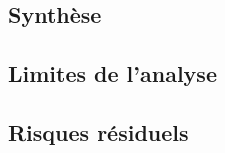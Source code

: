 
\subsection{Synthèse}
\label{sec:synthese}

\subsection{Limites de l'analyse}
\label{sec:limites}

\subsection{Risques résiduels}
\label{sec:risques-conclusion}

\label{fin-corps}
